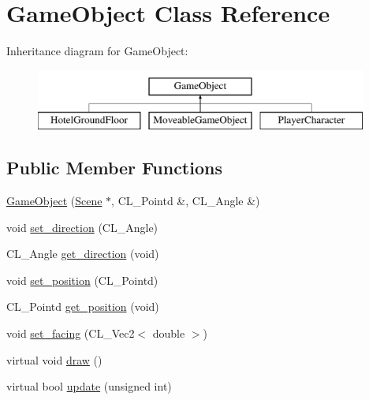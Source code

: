 \hypertarget{classGameObject}{
\section{GameObject Class Reference}
\label{classGameObject}
}
Inheritance diagram for GameObject:\begin{figure}[H]
\begin{center}
\leavevmode
\includegraphics[height=2cm]{classGameObject}
\end{center}
\end{figure}
\subsection*{Public Member Functions}
\begin{DoxyCompactItemize}
\item 
\hyperlink{classGameObject_a9174fcacc9b5ffd21984c6ff4a3b4d57}{GameObject} (\hyperlink{classScene}{Scene} $\ast$, CL\_\-Pointd \&, CL\_\-Angle \&)
\item 
void \hyperlink{classGameObject_ab9ec6aad5761262640a5ac771674a126}{set\_\-direction} (CL\_\-Angle)
\item 
CL\_\-Angle \hyperlink{classGameObject_ad0bc20831ec6c1f4c8f953c9f2d2f267}{get\_\-direction} (void)
\item 
void \hyperlink{classGameObject_a99a3cd93296266a8e482a90e9e9def96}{set\_\-position} (CL\_\-Pointd)
\item 
CL\_\-Pointd \hyperlink{classGameObject_a7b5c0d7e9729dff4a852518bbf4522af}{get\_\-position} (void)
\item 
void \hyperlink{classGameObject_a82f278ce2767bee4024daf2885209e62}{set\_\-facing} (CL\_\-Vec2$<$ double $>$)
\item 
virtual void \hyperlink{classGameObject_abb64143e72358beb808db22182517802}{draw} ()
\item 
virtual bool \hyperlink{classGameObject_ad2f3cd5d1f5a11b237507cd3ee98b95d}{update} (unsigned int)
\end{DoxyCompactItemize}
